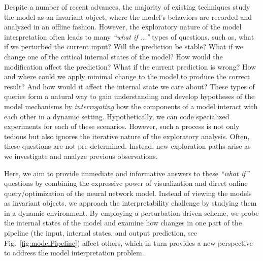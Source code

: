 Despite a number of recent advances, the majority of existing techniques study the model as an invariant object, where the model's behaviors are recorded and analyzed in an offline fashion.
%
However, the exploratory nature of the model interpretation often leads to many \emph{``what if ...''} types of questions,
such as, what if we perturbed the current input?
Will the prediction be stable?
What if we change one of the critical internal states of the model?
How would the modification affect the prediction?
What if the current prediction is wrong?
How and where could we apply minimal change to the model to produce the correct result? And how would it affect the internal state we care about? These types of queries form a natural way to gain understanding and develop hypotheses of the model mechanisms by \emph{interrogating} how the components of a model interact with each other in a dynamic setting.
Hypothetically, we can code specialized experiments for each of these scenarios.
However, such a process is not only tedious but also ignores the iterative nature of the exploratory analysis. Often, these questions are not pre-determined.
Instead, new exploration paths arise as we investigate and analyze previous observations.

Here, we aim to provide immediate and informative answers to these \emph{``what if''} questions by combining the expressive power of visualization and direct online query/optimization of the neural network model. Instead of viewing the models as invariant objects, we approach the interpretability challenge by studying them in a dynamic environment. By employing a perturbation-driven scheme, we probe the internal states of the model and examine how changes in one part of the pipeline (the input, internal states, and output prediction, see Fig.~\ref{fig:modelPipeline}) affect others, which in turn provides a new perspective to address the model interpretation problem.

